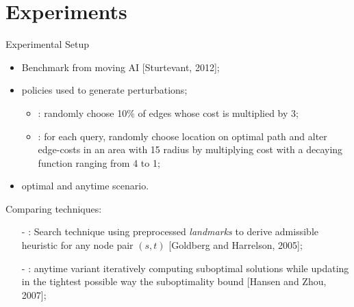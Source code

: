 \section*{Experiments}

\begin{frame}{Experimental Setup}
    
    \begin{itemize}
        \item Benchmark from moving AI [Sturtevant, 2012];
        \item policies used to generate perturbations;
            \begin{itemize}
                \item {}: randomly choose 10\% of edges whose cost is multiplied by 3;
                \item {}: for each query, randomly choose location on optimal path and alter edge-costs in an area with 15 radius by multiplying cost with a decaying function ranging from 4 to 1;
            \end{itemize}
        \item optimal and anytime scenario.
    \end{itemize}
    Comparing techniques:
    \begin{itemize}
        \item[-] \ALT{}: Search technique using preprocessed \textit{landmarks} to derive admissible heuristic for any node pair $(s, t)$ [Goldberg and Harrelson, 2005];
        \item[-] \AWA{}: \WA{} anytime variant iteratively computing suboptimal solutions while updating in the tightest possible way the suboptimality bound [Hansen and Zhou, 2007];
    \end{itemize}
\end{frame}


